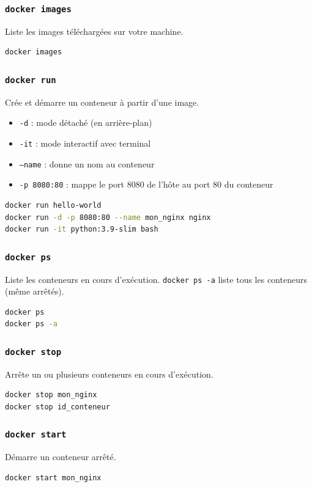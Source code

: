 \documentclass[a4paper,12pt]{article}
\begin{document}
\subsubsection{\texttt{docker images}}
Liste les images téléchargées sur votre machine.
\begin{lstlisting}[language=bash]
docker images
\end{lstlisting}

\subsubsection{\texttt{docker run}}
Crée et démarre un conteneur à partir d'une image.
\begin{itemize}
    \item \texttt{-d} : mode détaché (en arrière-plan)
    \item \texttt{-it} : mode interactif avec terminal
    \item \texttt{--name} : donne un nom au conteneur
    \item \texttt{-p 8080:80} : mappe le port 8080 de l'hôte au port 80 du conteneur
\end{itemize}
\begin{lstlisting}[language=bash]
docker run hello-world
docker run -d -p 8080:80 --name mon_nginx nginx
docker run -it python:3.9-slim bash
\end{lstlisting}

\subsubsection{\texttt{docker ps}}
Liste les conteneurs en cours d'exécution. \texttt{docker ps -a} liste tous les conteneurs (même arrêtés).
\begin{lstlisting}[language=bash]
docker ps
docker ps -a
\end{lstlisting}

\subsubsection{\texttt{docker stop}}
Arrête un ou plusieurs conteneurs en cours d'exécution.
\begin{lstlisting}[language=bash]
docker stop mon_nginx
docker stop id_conteneur
\end{lstlisting}

\subsubsection{\texttt{docker start}}
Démarre un conteneur arrêté.
\begin{lstlisting}[language=bash]
docker start mon_nginx
\end{lstlisting}
\end{document}
